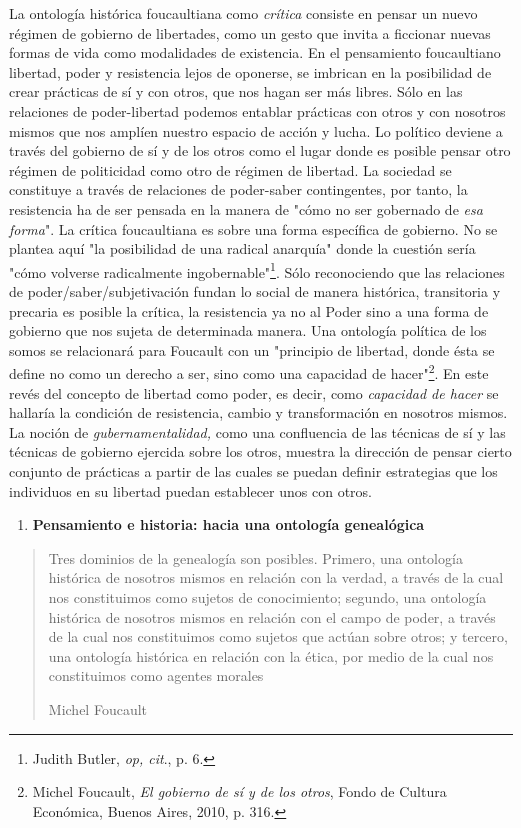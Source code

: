 \documentclass{book}
\begin{document}
La ontología histórica foucaultiana como \emph{crítica} consiste en
pensar un nuevo régimen de gobierno de libertades, como un gesto que
invita a ficcionar nuevas formas de vida como modalidades de existencia.
En el pensamiento foucaultiano libertad, poder y resistencia lejos de
oponerse, se imbrican en la posibilidad de crear prácticas de sí y con
otros, que nos hagan ser más libres. Sólo en las relaciones de
poder-libertad podemos entablar prácticas con otros y con nosotros
mismos que nos amplíen nuestro espacio de acción y lucha. Lo político
deviene a través del gobierno de sí y de los otros como el lugar donde
es posible pensar otro régimen de politicidad como otro de régimen de
libertad. La sociedad se constituye a través de relaciones de
poder-saber contingentes, por tanto, la resistencia ha de ser pensada en
la manera de "cómo no ser gobernado de \emph{esa forma}". La crítica
foucaultiana es sobre una forma específica de gobierno. No se plantea
aquí "la posibilidad de una radical anarquía" donde la cuestión sería
"cómo volverse radicalmente ingobernable"\footnote{Judith Butler,
  \emph{op, cit}., p. 6.}. Sólo reconociendo que las relaciones de
poder/saber/subjetivación fundan lo social de manera histórica,
transitoria y precaria es posible la crítica, la resistencia ya no al
Poder sino a una forma de gobierno que nos sujeta de determinada manera.
Una ontología política de los somos se relacionará para Foucault con un
"principio de libertad, donde ésta se define no como un derecho a ser,
sino como una capacidad de hacer"\footnote{Michel Foucault, \emph{El
  gobierno de sí y de los otros}, Fondo de Cultura Económica, Buenos
  Aires, 2010, p. 316.}. En este revés del concepto de libertad como
poder, es decir, como \emph{capacidad de hacer} se hallaría la condición
de resistencia, cambio y transformación en nosotros mismos. La noción de
\emph{gubernamentalidad,} como una confluencia de las técnicas de sí y
las técnicas de gobierno ejercida sobre los otros, muestra la dirección
de pensar cierto conjunto de prácticas a partir de las cuales se puedan
definir estrategias que los individuos en su libertad puedan establecer
unos con otros.

\begin{enumerate}
\def\labelenumi{\arabic{enumi}.}
\setcounter{enumi}{4}
\item
  \textbf{Pensamiento e historia: hacia una ontología genealógica}
\end{enumerate}

\begin{quote}
Tres dominios de la genealogía son posibles. Primero, una ontología
histórica de nosotros mismos en relación con la verdad, a través de la
cual nos constituimos como sujetos de conocimiento; segundo, una
ontología histórica de nosotros mismos en relación con el campo de
poder, a través de la cual nos constituimos como sujetos que actúan
sobre otros; y tercero, una ontología histórica en relación con la
ética, por medio de la cual nos constituimos como agentes morales

Michel Foucault
\end{quote}
\end{document}
